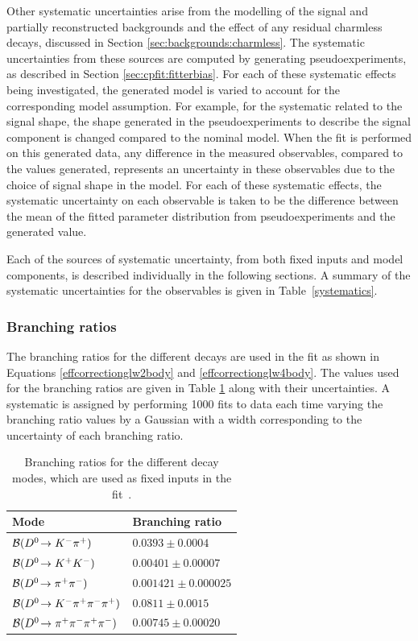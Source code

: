 Other systematic uncertainties arise from the modelling of the signal and partially reconstructed backgrounds and the effect of any residual charmless \B decays, discussed in Section \ref{sec:backgrounds:charmless}. The systematic uncertainties from these sources are computed by generating pseudoexperiments, as described in Section \ref{sec:cpfit:fitterbias}. For each of these systematic effects being investigated, the generated model is varied to account for the corresponding model assumption. For example, for the systematic related to the signal shape, the shape generated in the pseudoexperiments to describe the signal component is changed compared to the nominal model. When the fit is performed on this generated data, any difference in the measured \CP observables, compared to the values generated, represents an uncertainty in these observables due to the choice of signal shape in the model. For each of these systematic effects, the systematic uncertainty on each observable is taken to be the difference between the mean of the fitted parameter distribution from pseudoexperiments and the generated value. 

Each of the sources of systematic uncertainty, from both fixed inputs and model components, is described individually in the following sections. A summary of the systematic uncertainties for the \CP observables is given in Table~\ref{systematics}.

\subsubsection{Branching ratios}

The branching ratios for the different \D decays are used in the \CP fit as shown in Equations \ref{effcorrectionglw2body} and \ref{effcorrectionglw4body}. The values used for the branching ratios are given in Table \ref{BR} along with their uncertainties. A systematic is assigned by performing 1000 fits to data each time varying the branching ratio values by a Gaussian with a width corresponding to the uncertainty of each branching ratio.

\begin{table}
\centering
\begin{tabular}{l|l}
\hline
Mode & Branching ratio \\
\hline
$\mathcal{B}({{D}^0}\!\rightarrow {\ensuremath{{K}^-}}{\ensuremath{{\pi}^+}})$ & $0.0393 \pm 0.0004$ \\
$\mathcal{B}({{D}^0}\!\rightarrow {\ensuremath{{K}^+}}{\ensuremath{{K}^-}})$ & $0.00401 \pm 0.00007$ \\
$\mathcal{B}({{D}^0}\!\rightarrow {\ensuremath{{\pi}^+}}{\ensuremath{{\pi}^-}})$ & $0.001421 \pm 0.000025$ \\
$\mathcal{B}({{D}^0}\!\rightarrow {\ensuremath{{K}^-}}{\ensuremath{{\pi}^+}}{\ensuremath{{\pi}^-}}{\ensuremath{{\pi}^+}})$ & $0.0811 \pm 0.0015$ \\
$\mathcal{B}({{D}^0}\!\rightarrow {\ensuremath{{\pi}^+}}{\ensuremath{{\pi}^-}}{\ensuremath{{\pi}^+}}{\ensuremath{{\pi}^-}})$ & $0.00745 \pm 0.00020$ \\
\hline
\end{tabular}
\caption{Branching ratios for the different \Dz decay modes, which are used as fixed inputs in the \CP fit~\cite{PDG2014}.}
\label{BR}
\end{table}


